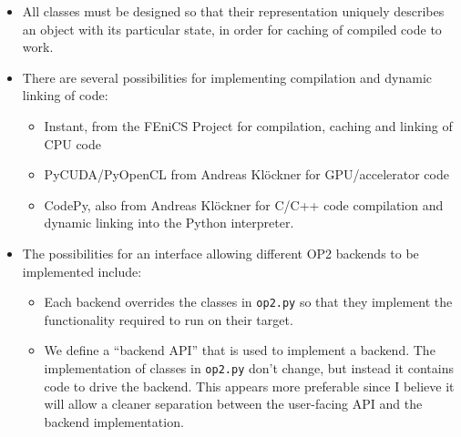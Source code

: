 \documentclass[a4paper]{article}
\begin{document}
\begin{itemize}
  \item All classes must be designed so that their representation uniquely describes an object with its particular state, in order for caching of compiled code to work.
  \item There are several possibilities for implementing compilation and dynamic linking of code:
  \begin{itemize}
    \item Instant, from the FEniCS Project for compilation, caching and linking of CPU code
    \item PyCUDA/PyOpenCL from Andreas Kl\"ockner for GPU/accelerator code
    \item CodePy, also from Andreas Kl\"ockner for C/C++ code compilation and dynamic linking into the Python interpreter.
  \end{itemize}
  \item The possibilities for an interface allowing different OP2 backends to be implemented include:
  \begin{itemize}
    \item Each backend overrides the classes in \verb|op2.py| so that they implement the functionality required to run on their target.
    \item We define a ``backend API'' that is used to implement a backend. The implementation of classes in \verb|op2.py| don't change, but instead it contains code to drive the backend. This appears more preferable since I believe it will allow a cleaner separation between the user-facing API and the backend implementation.
  \end{itemize}
\end{itemize}
\end{document}
